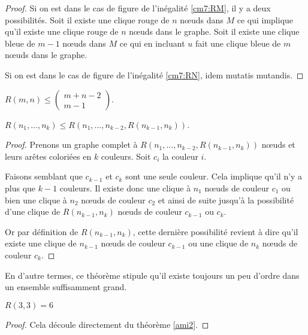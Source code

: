 \begin{mytheo} 
\begin{proof}
Si on est dans le cas de figure de l'inégalité \ref{cm7:RM}, il y a deux possibilités.
Soit il existe une clique rouge de $n$ nœuds dans $M$ ce qui implique qu'il existe une clique rouge de $n$ nœuds dans le graphe.
Soit il existe une clique bleue de $m-1$ nœuds dans $M$ ce qui en incluant $u$ fait une clique bleue de $m$ nœuds dans le graphe.

Si on est dans le cas de figure de l'inégalité \ref{cm7:RN}, idem mutatis mutandis.
  \end{proof}
\end{mytheo}

\begin{mycorr}
  $R(m,n) \leq \begin{pmatrix}
m+n-2\\
m-1
\end{pmatrix}$.
\end{mycorr}

\begin{mytheo}
$R(n_1,...,n_k) \leq R \left( n_1,...,n_{k-2},R(n_{k-1},n_k) \right)$.

\begin{proof}
  Prenons un graphe complet à $R(n_1, ..., n_{k-2}, R(n_{k-1}, n_k))$ nœuds et leurs arêtes coloriées en $k$ couleurs. Soit $c_i $ la couleur $i$.

  Faisons semblant que $c_{k-1}$ et $c_{k}$ sont une seule couleur.
  Cela implique qu'il n'y a plus que $k-1$ couleurs.
  Il existe donc une clique à $n_1$ nœuds de couleur $c_1$ ou bien une clique à $n_2$ nœuds de couleur $c_2$ et ainsi de suite jusqu'à la possibilité d'une clique de $R(n_{k-1}, n_k)$ nœuds de couleur $c_{k-1}$ ou $c_{k}$.

  Or par définition de $R(n_{k-1}, n_k)$, cette dernière possibilité revient à dire qu'il existe une clique de $n_{k-1}$ nœuds de couleur $c_{k-1}$ ou une clique de $n_{k}$ nœuds de couleur $c_{k}$.
\end{proof}
\end{mytheo}

\vspace{0.3cm}
En d'autre termes, ce théorème stipule qu'il existe toujours un peu d'ordre dans un ensemble suffisamment grand.

\begin{mytheo} 
  $R(3, 3) = 6$
  \begin{proof}
     Cela découle directement du théorème \ref{ami2}.
  \end{proof}
\end{mytheo}


